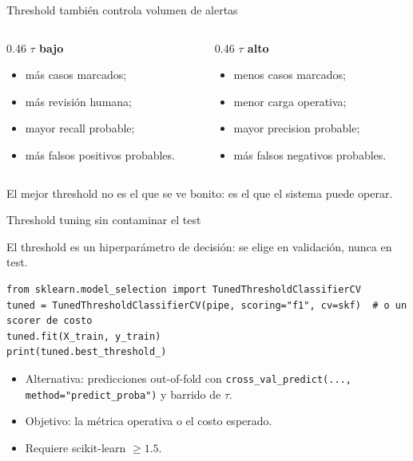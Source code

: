 \documentclass[aspectratio=169,12pt]{beamer}
\newcommand{\colhead}[1]{\textbf{#1}\par\vspace{2pt}}
\begin{document}
\begin{frame}{Threshold también controla volumen de alertas}
  \begin{columns}[T]
    \begin{column}{0.46\textwidth}
      \colhead{$\tau$ bajo}
      \begin{itemize}
        \item más casos marcados;
        \item más revisión humana;
        \item mayor recall probable;
        \item más falsos positivos probables.
      \end{itemize}
    \end{column}
    \begin{column}{0.46\textwidth}
      \colhead{$\tau$ alto}
      \begin{itemize}
        \item menos casos marcados;
        \item menor carga operativa;
        \item mayor precision probable;
        \item más falsos negativos probables.
      \end{itemize}
    \end{column}
  \end{columns}
  \vspace{8pt}
  \begin{center}
    El mejor threshold no es el que se ve bonito: es el que el sistema puede operar.
  \end{center}
\end{frame}


\begin{frame}[fragile]{Threshold tuning sin contaminar el test}
  \begin{center}
    El threshold es un hiperparámetro de decisión: se elige en validación, nunca en test.
  \end{center}
\begin{lstlisting}[basicstyle=\ttfamily\scriptsize,columns=fullflexible,keepspaces=true]
from sklearn.model_selection import TunedThresholdClassifierCV
tuned = TunedThresholdClassifierCV(pipe, scoring="f1", cv=skf)  # o un scorer de costo
tuned.fit(X_train, y_train)
print(tuned.best_threshold_)
\end{lstlisting}
  \small
  \begin{itemize}
    \item Alternativa: predicciones out-of-fold con \texttt{cross\_val\_predict(..., method="predict\_proba")} y barrido de $\tau$.
    \item Objetivo: la métrica operativa o el costo esperado.
    \item Requiere scikit-learn $\geq 1.5$.
  \end{itemize}
\end{frame}
\end{document}
